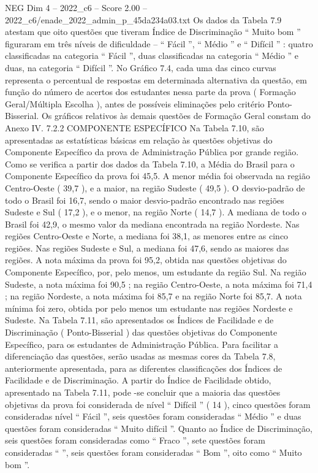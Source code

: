 \begin{textsample}{NEG Dim 4 – 2022\_c6 – Score 2.00 – 2022\_c6/enade\_2022\_admin\_p\_45da234a03.txt}
Os dados da Tabela 7.9 atestam que oito questões que tiveram Índice de Discriminação “ Muito bom ” figuraram em três níveis de dificuldade – “ Fácil ”, “ Médio ” e “ Difícil ” : quatro classificadas na categoria “ Fácil ”, duas classificadas na categoria “ Médio ” e duas, na categoria “ Difícil ”.
No Gráfico 7.4, cada uma das cinco curvas representa o percentual de respostas em determinada alternativa da questão, em função do número de acertos dos estudantes nessa parte da prova ( Formação Geral/Múltipla Escolha ), antes de possíveis eliminações pelo critério Ponto-Bisserial.
Os gráficos relativos às demais questões de Formação Geral constam do Anexo IV. 7.2.2 COMPONENTE ESPECÍFICO Na Tabela 7.10, são apresentadas as estatísticas básicas em relação às questões objetivas do Componente Específico da prova de Administração Pública por grande região.
Como se verifica a partir dos dados da Tabela 7.10, a Média do Brasil para o Componente Específico da prova foi 45,5.
A menor média foi observada na região Centro-Oeste ( 39,7 ), e a maior, na região Sudeste ( 49,5 ).
O desvio-padrão de todo o Brasil foi 16,7, sendo o maior desvio-padrão encontrado nas regiões Sudeste e Sul ( 17,2 ), e o menor, na região Norte ( 14,7 ).
A mediana de todo o Brasil foi 42,9, o mesmo valor da mediana encontrada na região Nordeste.
Nas regiões Centro-Oeste e Norte, a mediana foi 38,1, as menores entre as cinco regiões.
Nas regiões Sudeste e Sul, a mediana foi 47,6, sendo as maiores das regiões.
A nota máxima da prova foi 95,2, obtida nas questões objetivas do Componente Específico, por, pelo menos, um estudante da região Sul.
Na região Sudeste, a nota máxima foi 90,5 ; na região Centro-Oeste, a nota máxima foi 71,4 ; na região Nordeste, a nota máxima foi 85,7 e na região Norte foi 85,7.
A nota mínima foi zero, obtida por pelo menos um estudante nas regiões Nordeste e Sudeste.
Na Tabela 7.11, são apresentados os Índices de Facilidade e de Discriminação ( Ponto-Bisserial ) das questões objetivas do Componente Específico, para os estudantes de Administração Pública.
Para facilitar a diferenciação das questões, serão usadas as mesmas cores da Tabela 7.8, anteriormente apresentada, para as diferentes classificações dos Índices de Facilidade e de Discriminação.
A partir do Índice de Facilidade obtido, apresentado na Tabela 7.11, pode -se concluir que a maioria das questões objetivas da prova foi considerada de nível “ Difícil ” ( 14 ), cinco questões foram consideradas nível “ Fácil ”, seis questões foram consideradas “ Médio ” e duas questões foram consideradas “ Muito difícil ”.
Quanto ao Índice de Discriminação, seis questões foram consideradas como “ Fraco ”, sete questões foram consideradas “ ”, seis questões foram consideradas “ Bom ”, oito como “ Muito bom ”.

\end{textsample}
